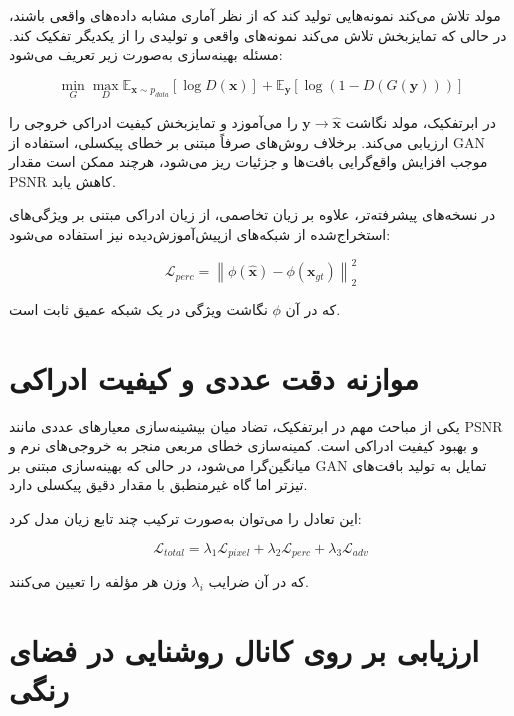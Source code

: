 مولد تلاش می‌کند نمونه‌هایی تولید کند که از نظر آماری مشابه داده‌های واقعی باشند، در حالی که تمایزبخش تلاش می‌کند نمونه‌های واقعی و تولیدی را از یکدیگر تفکیک کند. مسئله بهینه‌سازی به‌صورت زیر تعریف می‌شود:

\begin{equation}
	\min_G \max_D
	\mathbb{E}_{\mathbf{x}\sim p_{data}}
	[\log D(\mathbf{x})]
	+
	\mathbb{E}_{\mathbf{y}}
	[\log(1 - D(G(\mathbf{y})))]
\end{equation}

در ابرتفکیک، مولد نگاشت $\mathbf{y} \rightarrow \hat{\mathbf{x}}$ را می‌آموزد و تمایزبخش کیفیت ادراکی خروجی را ارزیابی می‌کند. برخلاف روش‌های صرفاً مبتنی بر خطای پیکسلی، استفاده از GAN موجب افزایش واقع‌گرایی بافت‌ها و جزئیات ریز می‌شود، هرچند ممکن است مقدار PSNR کاهش یابد.

در نسخه‌های پیشرفته‌تر، علاوه بر زیان تخاصمی، از زیان ادراکی مبتنی بر ویژگی‌های استخراج‌شده از شبکه‌های ازپیش‌آموزش‌دیده نیز استفاده می‌شود:

\begin{equation}
	\mathcal{L}_{perc} =
	\left\|
	\phi(\hat{\mathbf{x}})
	-
	\phi(\mathbf{x}_{gt})
	\right\|_2^2
\end{equation}

که در آن $\phi$ نگاشت ویژگی در یک شبکه عمیق ثابت است.

\section{موازنه دقت عددی و کیفیت ادراکی}

یکی از مباحث مهم در ابرتفکیک، تضاد میان بیشینه‌سازی معیارهای عددی مانند PSNR و بهبود کیفیت ادراکی است. کمینه‌سازی خطای مربعی منجر به خروجی‌های نرم و میانگین‌گرا می‌شود، در حالی که بهینه‌سازی مبتنی بر GAN تمایل به تولید بافت‌های تیزتر اما گاه غیرمنطبق با مقدار دقیق پیکسلی دارد.

این تعادل را می‌توان به‌صورت ترکیب چند تابع زیان مدل کرد:

\begin{equation}
	\mathcal{L}_{total} =
	\lambda_1 \mathcal{L}_{pixel}
	+
	\lambda_2 \mathcal{L}_{perc}
	+
	\lambda_3 \mathcal{L}_{adv}
\end{equation}

که در آن ضرایب $\lambda_i$ وزن هر مؤلفه را تعیین می‌کنند.
\section{ارزیابی بر روی کانال روشنایی در فضای رنگی}

